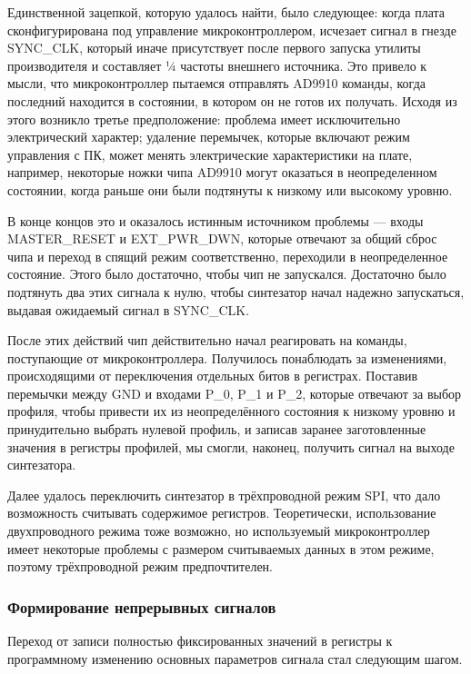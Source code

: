 \documentclass[rusmathsym, eqnumwithinsec, amspack, hyperref]{bomgost}
\begin{document}
Единственной зацепкой, которую удалось найти, было следующее: когда плата сконфигурирована под управление микроконтроллером, исчезает сигнал в гнезде SYNC\_CLK, который иначе присутствует после первого запуска утилиты производителя и составляет ¼ частоты внешнего источника. Это привело к мысли, что микроконтроллер пытаемся отправлять AD9910 команды, когда последний находится в состоянии, в котором он не готов их получать. Исходя из этого возникло третье предположение: проблема имеет исключительно электрический характер; удаление перемычек, которые включают режим управления с ПК, может менять электрические характеристики на плате, например, некоторые ножки чипа AD9910 могут оказаться в неопределенном состоянии, когда раньше они были подтянуты к низкому или высокому уровню.

В конце концов это и оказалось истинным источником проблемы --- входы MASTER\_RESET и EXT\_PWR\_DWN, которые отвечают за общий сброс чипа и переход в спящий режим соответственно, переходили в неопределенное состояние. Этого было достаточно, чтобы чип не запускался. Достаточно было подтянуть два этих сигнала к нулю, чтобы синтезатор начал надежно запускаться, выдавая ожидаемый сигнал в SYNC\_CLK.

После этих действий чип действительно начал реагировать на команды, поступающие от микроконтроллера. Получилось понаблюдать за изменениями, происходящими от переключения отдельных битов в регистрах. Поставив перемычки между GND и входами P\_0, P\_1 и P\_2, которые отвечают за выбор профиля, чтобы привести их из неопределённого состояния к низкому уровню и принудительно выбрать нулевой профиль, и записав заранее заготовленные значения в регистры профилей, мы смогли, наконец, получить сигнал на выходе синтезатора.

Далее удалось переключить синтезатор в трёхпроводной режим SPI, что дало возможность считывать содержимое регистров. Теоретически, использование двухпроводного режима тоже возможно, но используемый микроконтроллер имеет некоторые проблемы с размером считываемых данных в этом режиме, поэтому трёхпроводной режим предпочтителен.

\subsubsection{Формирование непрерывных сигналов}

Переход от записи полностью фиксированных значений в регистры к программному изменению основных параметров сигнала стал следующим шагом.
\end{document}
